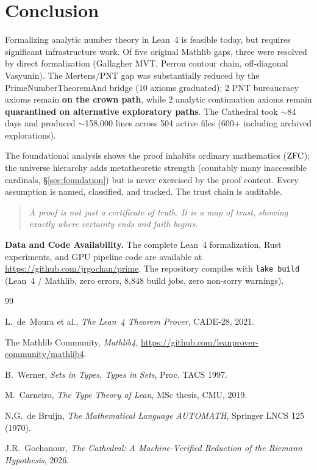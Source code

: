 \documentclass[11pt,a4paper]{article}
\begin{document}
\section{Conclusion}

Formalizing analytic number theory in Lean~4 is feasible today, but
requires significant infrastructure work. Of five original Mathlib
gaps, three were resolved by direct formalization (Gallagher MVT,
Perron contour chain, off-diagonal Vasyunin). The Mertens/PNT gap
was substantially reduced by the PrimeNumberTheoremAnd bridge
(10 axioms graduated); 2 PNT bureaucracy axioms remain
\textbf{on the crown path}, while 2 analytic
continuation axioms remain \textbf{quarantined on alternative
exploratory paths}. The Cathedral took $\sim$84 days and produced
$\sim$158{,}000 lines across 504 active files (600+ including archived
explorations).

The foundational analysis shows the proof inhabits ordinary
mathematics ($\mathrm{ZFC}$); the universe hierarchy adds metatheoretic
strength (countably many inaccessible cardinals, \S\ref{sec:foundation})
but is never exercised by the proof content. Every assumption is named, classified,
and tracked. The trust chain is auditable.

\begin{quote}
\emph{A proof is not just a certificate of truth. It is a map of
trust, showing exactly where certainty ends and faith begins.}
\end{quote}

\medskip\noindent
\textbf{Data and Code Availability.}
The complete Lean~4 formalization, Rust experiments, and GPU
pipeline code are available at
\url{https://github.com/jrgochan/prime}.
The repository compiles with \texttt{lake build} (Lean~4 /
Mathlib, zero errors, 8{,}848 build jobs, zero non-sorry warnings).

\begin{thebibliography}{99}

L.~de~Moura et al., \emph{The Lean~4 Theorem Prover}, CADE-28, 2021.

The Mathlib Community, \emph{Mathlib4},
\url{https://github.com/leanprover-community/mathlib4}.

B.~Werner, \emph{Sets in Types, Types in Sets}, Proc. TACS 1997.

M.~Carneiro, \emph{The Type Theory of Lean}, MSc thesis, CMU, 2019.

N.G.~de Bruijn, \emph{The Mathematical Language AUTOMATH},
Springer LNCS 125 (1970).

J.R.~Gochanour, \emph{The Cathedral: A Machine-Verified Reduction
of the Riemann Hypothesis}, 2026.

\end{thebibliography}
\end{document}
